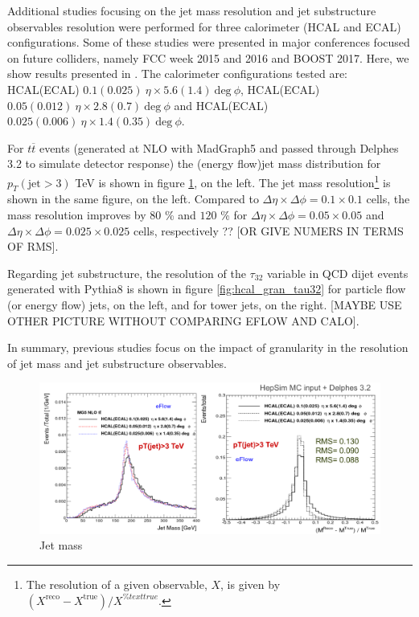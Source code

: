 Additional studies focusing on the jet mass resolution and jet substructure observables resolution were performed for three calorimeter (HCAL and ECAL) configurations. Some of these studies were presented in major conferences focused on future colliders, namely FCC week 2015 and 2016 and BOOST 2017. Here, we show results presented in \cite{FCCweek2015,FCCweek2016,BOOST2017}. The calorimeter configurations tested are: HCAL(ECAL) $0.1(0.025)~\eta \times 5.6(1.4)~\text{deg}~\phi$, HCAL(ECAL) $0.05(0.012)~\eta \times 2.8(0.7)~\text{deg}~\phi$ and HCAL(ECAL) $0.025(0.006)~\eta \times 1.4(0.35)~\text{deg}~\phi$. 

For $t\overline{t}$ events (generated at NLO with MadGraph5 and passed through Delphes 3.2 to simulate detector response) the (energy flow)jet mass distribution for $p_T(\text{jet}>3)$ TeV is shown in figure \ref{fig:hcal_gran_jet_mass}, on the left. The jet mass resolution\footnote{The resolution of a given observable, $X$, is given by $(X^{\text{reco}}-X^{\text{true}})/X^{\%text{true}}$.} is shown in the same figure, on the left. Compared to $\Delta\eta\times\Delta\phi=0.1\times0.1$ cells, the mass resolution improves by $80$ \% and $120$ \% for $\Delta\eta\times\Delta\phi=0.05\times0.05$ and $\Delta\eta\times\Delta\phi=0.025\times0.025$ cells, respectively ?? [OR GIVE NUMERS IN TERMS OF RMS].

Regarding jet substructure, the resolution of the $\tau_{32}$ variable in QCD dijet events generated with Pythia8 is shown in figure \ref{fig:hcal_gran_tau32} for particle flow (or energy flow) jets, on the left, and for tower jets, on the right. [MAYBE USE OTHER PICTURE WITHOUT COMPARING EFLOW AND CALO].

In summary, previous studies focus on the impact of granularity in the resolution of jet mass and jet substructure observables. 

\begin{figure}
	\centering
	\includegraphics[width=\textwidth]{./Figures/hcal_gran_jet_mass.png}
	\caption{Jet mass}
	\label{fig:hcal_gran_jet_mass}
\end{figure}

